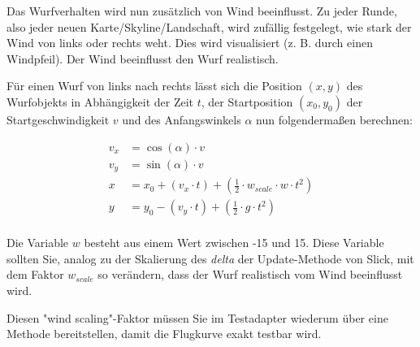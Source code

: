 Das Wurfverhalten wird nun zusätzlich von Wind beeinflusst. Zu jeder Runde, also jeder neuen Karte/Skyline/Landschaft, wird zufällig festgelegt, wie stark der Wind von links oder rechts weht. Dies wird visualisiert (z. B. durch einen Windpfeil). Der Wind beeinflusst den Wurf realistisch.

Für einen Wurf von links nach rechts lässt sich die Position $(x, y)$ des Wurfobjekts in Abhängigkeit der Zeit $t$, der Startposition $(x_0, y_0)$ der Startgeschwindigkeit $v$ und des Anfangswinkels $\alpha$ nun folgendermaßen berechnen: 

\begin{align*}
v_x &= \cos (\alpha) \cdot v \\
v_y &= \sin (\alpha) \cdot v \\
x &= x_0 + (v_x \cdot t) + (\frac{1}{2} \cdot w_{scale} \cdot w \cdot t^2) \\
y &= y_0 - (v_y \cdot t) + (\frac{1}{2} \cdot g \cdot t^2) \\
\end{align*}

Die Variable $w$ besteht aus einem Wert zwischen -15 und 15. Diese Variable sollten Sie, analog zu der Skalierung des \textit{delta}
der Update-Methode von Slick, mit dem Faktor $w_{scale}$ so verändern, dass der Wurf realistisch vom Wind beeinflusst wird. 

Diesen "wind scaling"-Faktor müssen Sie im Testadapter wiederum über eine Methode bereitstellen, damit die Flugkurve exakt testbar wird.
